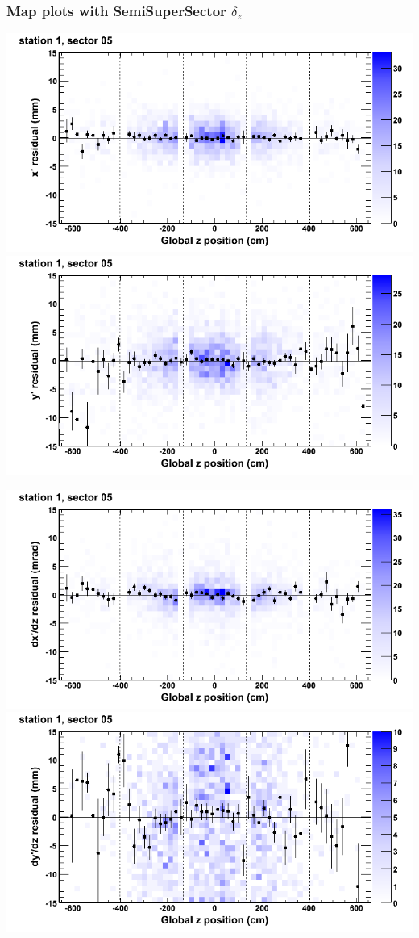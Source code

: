 \documentclass[compress]{beamer}
\begin{document}
\begin{frame}
\frametitle{Map plots with SemiSuperSector $\delta_z$}
\includegraphics[width=0.5\linewidth]{zfit_mapplots/DTvsz_st1sec05_x.png}
\includegraphics[width=0.5\linewidth]{zfit_mapplots/DTvsz_st1sec05_y.png}

\includegraphics[width=0.5\linewidth]{zfit_mapplots/DTvsz_st1sec05_dxdz.png}
\includegraphics[width=0.5\linewidth]{zfit_mapplots/DTvsz_st1sec05_dydz.png}
\end{frame}
\end{document}
